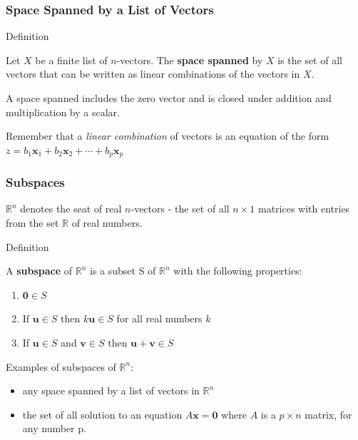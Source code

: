 \documentclass{beamer}
\newcommand{\Real}{\ensuremath{\mathbb{R}}}
\newcommand{\RealN}{\ensuremath{\mathbb{R}^n}}
\newcommand{\Mtx}[1]{\ensuremath{\mathbf{#1}}}
\begin{document}
\begin{frame}
  \frametitle{Space Spanned by a List of Vectors}


\begin{block}{Definition}

Let $X$ be a finite list of $n$-vectors. The \textbf{space spanned} by $X$ is the set of all vectors that can be written as linear combinations of the vectors in $X$.
\medskip

A space spanned includes the zero vector and is closed under addition and multiplication by a scalar.

\end{block}
\bigskip

Remember that a \emph{linear combination} of vectors is an equation of the form $z = b_1 \Mtx{x}_1 + b_2 \Mtx{x}_2 + \cdots + b_p \Mtx{x}_p$

\end{frame}



\begin{frame}
  \frametitle{Subspaces}

$\RealN$  denotes the seat of real $n$-vectors - the set of all $n \times 1$ matrices with entries from the set $\Real$ of real numbers.
\medskip

\begin{block}{Definition}

A \textbf{subspace} of $\Real^n$ is a subset S of $\Real^n$ with the following properties:
\begin{enumerate}
	\item $\Mtx{0} \in S$
	\item If $\Mtx{u} \in S$ then $k\Mtx{u} \in S$ for all real numbers $k$
	\item If $\Mtx{u} \in S$ and  $\Mtx{v} \in S$ then $\Mtx{u} + \Mtx{v} \in S$
\end{enumerate}

\end{block}

Examples of subspaces of $\Real^n$:
\begin{itemize}
	\item any space spanned by a list of vectors in $\Real^n$
	\item the set of all solution to an equation $A\Mtx{x} = \Mtx{0}$ where $A$ is a $p \times n$ matrix, for any number p.
\end{itemize}

\end{frame}
\end{document}

